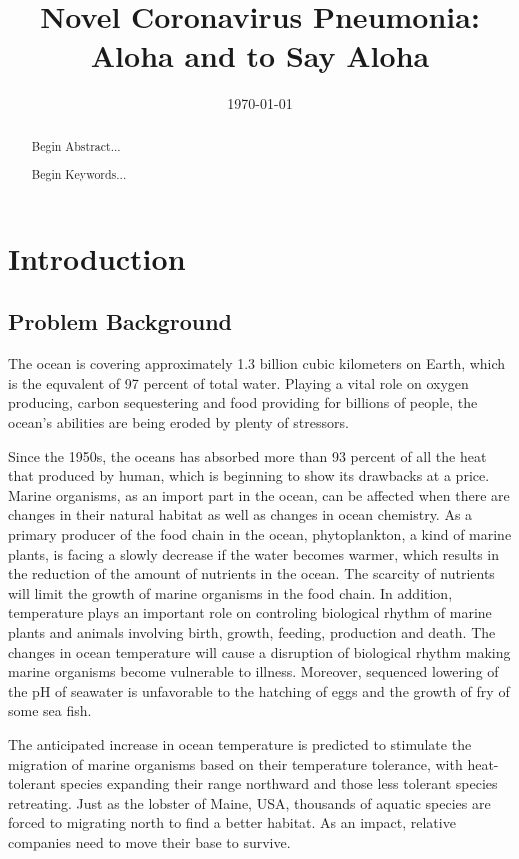 \documentclass{mcmthesis}
\begin{document}
\linespread{0.6} %
\setlength{\parskip}{0.5\baselineskip} %

\title{Novel Coronavirus Pneumonia: Aloha and to Say Aloha}

\date{\today}
	\begin{abstract}
\hspace{1.2em}
	Begin Abstract...
		\begin{keywords}
			Begin Keywords...
		\end{keywords}
	\end{abstract}


\maketitle

\tableofcontents

\newpage


\section{Introduction}	\label{S1}

\subsection{Problem Background}
	The ocean is covering approximately 1.3 billion cubic kilometers on Earth, which is the equvalent of 97 percent of total water. Playing a vital role on oxygen producing, carbon sequestering and food providing for billions of people, the ocean's abilities are being eroded by plenty of stressors. \par
	Since the 1950s, the oceans has absorbed more than 93 percent of all the heat that produced by human, which is beginning to show its drawbacks at a price. Marine organisms, as an import part in the ocean, can be affected when there are changes in their natural habitat as well as changes in ocean chemistry. As a primary producer of the food chain in the ocean, phytoplankton, a kind of marine plants, is facing a slowly decrease if the water becomes warmer, which results in the reduction of the amount of nutrients in the ocean. The scarcity of nutrients will limit the growth of marine organisms in the food chain. In addition, temperature plays an important role on controling biological rhythm of marine plants and animals involving birth, growth, feeding, production and death. The changes in ocean temperature will cause a disruption of biological rhythm making marine organisms become vulnerable to illness. Moreover, sequenced lowering of the pH of seawater is unfavorable to the hatching of eggs and the growth of fry of some sea fish.\par
	The anticipated increase in ocean temperature is predicted to stimulate the migration of marine organisms based on their temperature tolerance, with heat-tolerant species expanding their range northward and those less tolerant species retreating. Just as the lobster of Maine, USA, thousands of aquatic species are forced to migrating north to find a better habitat. As an impact, relative companies need to move their base to survive. \par
	
\end{document}
